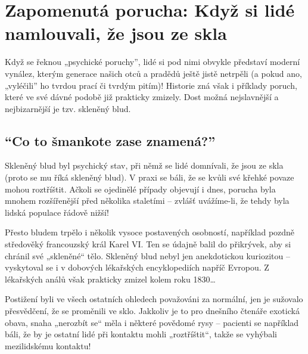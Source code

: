 \documentclass[main.tex]{subfiles}
\begin{document}
\section{Zapomenutá porucha: Když si lidé namlouvali, že jsou ze skla}
Když se řeknou „psychické poruchy”, lidé si pod nimi obvykle představí moderní vynález, kterým generace našich otců a pradědů ještě jistě netrpěli (a pokud ano, „vyléčili” ho tvrdou prací či tvrdým pitím)! Historie zná však i příklady poruch, které ve své dávné podobě již prakticky zmizely. Dost možná nejslavnější a nejbizarnější je tzv. skleněný blud.
\subsection*{\enquote{Co to šmankote zase znamená?}}
Skleněný blud byl psychický stav, při němž se lidé domnívali, že jsou ze skla (proto se mu říká skleněný blud). V praxi se báli, že se kvůli své křehké povaze mohou roztříštit. Ačkoli se ojedinělé případy objevují i dnes, porucha byla mnohem rozšířenější před několika staletími – zvlášť uvážíme-li, že tehdy byla lidská populace řádově nižší!\par
Přesto bludem trpělo i několik vysoce postavených osobností, například pozdně středověký francouzský král Karel VI. Ten se údajně balil do přikrývek, aby si chránil své „skleněné“ tělo. Skleněný blud nebyl jen anekdotickou kuriozitou – vyskytoval se i v dobových lékařských encyklopediích napříč Evropou. Z lékařských análů však prakticky zmizel kolem roku 1830…\par
Postižení byli ve všech ostatních ohledech považováni za normální, jen je sužovalo přesvědčení, že se proměnili ve sklo. Jakkoliv je to pro dnešního čtenáře exotická obava, snaha „nerozbít se“ měla i některé povědomé rysy – pacienti se například báli, že by je ostatní lidé při kontaktu mohli „roztříštit“, takže se vyhýbali mezilidskému kontaktu!
\end{document}
